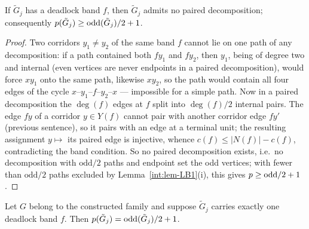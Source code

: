 \begin{lemma}\label{com:lem-bandblocks}
If $\tilde G_j$ has a deadlock band $f$, then $\tilde G_j$ admits no
paired decomposition; consequently
$p(\tilde G_j)\ge\mathrm{odd}(\tilde G_j)/2+1$.
\end{lemma}

\begin{proof}
Two corridors $y_1\ne y_2$ of the same band $f$ cannot lie on one path of
any decomposition: if a path contained both $fy_1$ and $fy_2$, then
$y_1$, being of degree two and internal (even vertices are never
endpoints in a paired decomposition), would force $xy_1$ onto the same
path, likewise $xy_2$, so the path would contain all four edges of the
cycle $x$--$y_1$--$f$--$y_2$--$x$ --- impossible for a simple path. Now in
a paired decomposition the $\deg(f)$ edges at $f$ split into
$\deg(f)/2$ internal pairs. The edge $fy$ of a corridor $y\in Y(f)$
cannot pair with another corridor edge $fy'$ (previous sentence), so it
pairs with an edge at a terminal unit; the resulting assignment
$y\mapsto$ its paired edge is injective, whence
$c(f)\le|N(f)|-c(f)$, contradicting the band condition. So no paired
decomposition exists, i.e.\ no decomposition with $\mathrm{odd}/2$ paths
and endpoint set the odd vertices; with fewer than $\mathrm{odd}/2$ paths
excluded by Lemma~\ref{int:lem-LB1}(i), this gives
$p\ge\mathrm{odd}/2+1$.
\end{proof}

\begin{proposition}\label{com:prop-patch}
Let $G$ belong to the constructed family and suppose $\tilde G_j$ carries
exactly one deadlock band $f$. Then
$p(\tilde G_j)=\mathrm{odd}(\tilde G_j)/2+1$.
\end{proposition}

